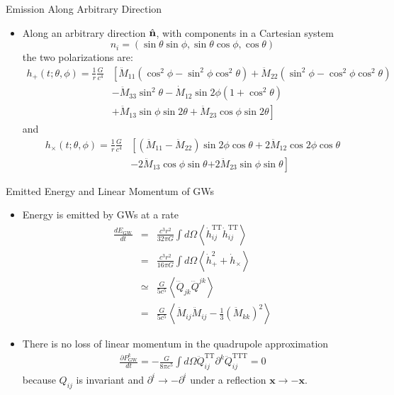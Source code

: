 \documentclass[size=11pt,style=paintings]{powerdot}
\begin{document}
\begin{slide}{Emission Along Arbitrary Direction}
 \begin{itemize}
 \item Along an arbitrary direction $\hat{\bf n}$, with components in a Cartesian system
$$ n_{i}=(\sin \theta \sin \phi, \sin \theta \cos \phi, \cos \theta)$$
the two polarizations are:
$$
\begin{aligned} 
h_{+}(t ; \theta, \phi)=\frac{1}{r} \frac{G}{c^{4}} &\left[ \ddot{M}_{11}\left(\cos ^{2} \phi-\sin ^{2} \phi \cos ^{2} \theta\right) +\ddot{M}_{22}\left(\sin
^{2} \phi-\cos ^{2} \phi \cos ^{2} \theta\right) \right. \\ &-\ddot{M}_{33} \sin ^{2} \theta -\dot{M}_{12} \sin 2 \phi\left(1+\cos ^{2} \theta\right) \\ &+ \left.\ddot{M}_{13} \sin \phi \sin 2 \theta +\ddot{M}_{23} \cos \phi \sin 2 \theta  \right] \end{aligned}
$$
and
$$
\begin{aligned} h_{\times}(t ; \theta, \phi)=\frac{1}{r} \frac{G}{c^{4}}&\left[\left(\ddot{M}_{11}-\ddot{M}_{22}\right) \sin 2 \phi \cos \theta +2 \ddot{M}_{12} \cos 2 \phi \cos \theta \right. \\ &-2 \ddot{M}_{13} \cos \phi \sin \theta \left.+2 \ddot{M}_{23} \sin \phi  \sin \theta\right] \end{aligned}
$$
 \end{itemize}
 \end{slide}



\begin{slide}{Emitted Energy and Linear Momentum of GWs}

  \begin{itemize}
    \item Energy is emitted by GWs at a rate
\begin{eqnarray}
\frac{d E_{\mathrm{GW}}}{d t} &=&\frac{c^{3} r^{2}}{32 \pi G} \int d \Omega\left\langle\dot{h}_{i
j}^{\mathrm{TT}} \dot{h}_{i j}^{\mathrm{TT}}\right\rangle \\
&=&\frac{c^{3} r^{2}}{16 \pi G} \int d \Omega\left\langle\dot{h}_{+}^{2}+\dot{h}_{\times}\right\rangle \\
&\simeq&\frac{G}{5c^{5}} \left\langle\dddot{Q}_{j k} \dddot{Q}^{j k}\right\rangle \\
&=&\frac{G}{5 c^{5}}\left\langle\ddot{M}_{i j} \ddot{M}_{i j} -\frac{1}{3}\left(\ddot{M}_{k k}\right)^{2}\right\rangle
\end{eqnarray}
    \item There is no loss of linear momentum in the quadrupole approximation
\begin{eqnarray}
\frac{\partial P_{\mathrm{GW}}^{k}}{d t}
=-\frac{G}{8 \pi c^{5}} \int d \Omega \ddot{Q}_{ij}^{\mathrm{TT}} \partial^{k} \ddot{Q}_{ij}^{\mathrm{TTT}} =0
\end{eqnarray}
because  $Q_{ij}$ is invariant and $\partial^{i} \rightarrow-\partial^{i}$ under a reflection $\mathbf{x} \rightarrow-\mathbf{x}$.  
\end{itemize}
\end{slide}
\end{document}
